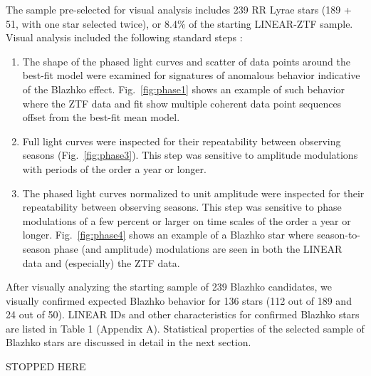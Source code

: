 The sample pre-selected for visual analysis includes 239 RR Lyrae stars (189 + 51, with one star selected twice),
or 8.4\% of the starting LINEAR-ZTF sample. Visual analysis included the following standard steps
\citep[e.g.,][]{2009MNRAS.400.1006J, 2017MNRAS.466.2602P}: 
\begin{enumerate}
\item The shape of the phased light curves and scatter of data points around the best-fit model were examined
    for signatures of anomalous behavior indicative of the Blazhko effect. 
    Fig.~\ref{fig:phase1} shows an example of such behavior where the ZTF data and fit show multiple coherent data point sequences
    offset from the best-fit mean model. 
  \item Full light curves were inspected for their repeatability between observing seasons (Fig.~\ref{fig:phase3}).
       This step was sensitive to amplitude modulations with periods of the order a year or longer.  
     \item The phased light curves normalized to unit amplitude were inspected for their repeatability between observing seasons.
       This step was sensitive to phase modulations of a few percent or larger on time scales of the order a year or longer.  
       Fig.~\ref{fig:phase4} shows an example of a Blazhko star where season-to-season phase (and amplitude) modulations
       are seen in both the LINEAR data and (especially) the ZTF data. 
\end{enumerate}

After visually analyzing the starting sample of 239 Blazhko candidates, we visually confirmed expected Blazhko
behavior for 136 stars (112 out of 189 and 24 out of 50). LINEAR IDs and other characteristics for confirmed
Blazhko stars are listed in Table 1 (Appendix A). Statistical properties of the selected sample of Blazhko stars are
discussed in detail in the next section. 


STOPPED HERE

